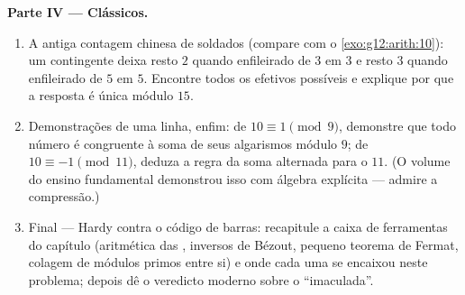 \begin{problem}
\medskip
\noindent\textbf{Parte IV --- Clássicos.}
\begin{enumerate}[resume]
  \item A antiga contagem chinesa de soldados (compare com o
        \cref{exo:g12:arith:10}): um contingente deixa resto $2$
        quando enfileirado de $3$ em $3$ e resto $3$ quando
        enfileirado de $5$ em $5$. Encontre todos os efetivos
        possíveis e explique por que a resposta é única módulo
        $15$.
  \item Demonstrações de uma linha, enfim: de $10 \equiv 1
        \pmod 9$, demonstre que todo número é congruente à soma
        de seus algarismos módulo $9$; de $10 \equiv -1
        \pmod{11}$, deduza a regra da soma alternada para o $11$.
        (O volume do ensino fundamental demonstrou isso com
        álgebra explícita --- admire a compressão.)
  \item Final --- Hardy contra o código de barras: recapitule a
        caixa de ferramentas do capítulo (aritmética das
        , inversos de Bézout, pequeno teorema de
        Fermat, colagem de módulos primos entre si) e onde cada
        uma se encaixou neste problema; depois dê o veredicto
        moderno sobre o ``imaculada''.
\end{enumerate}
\end{problem}
